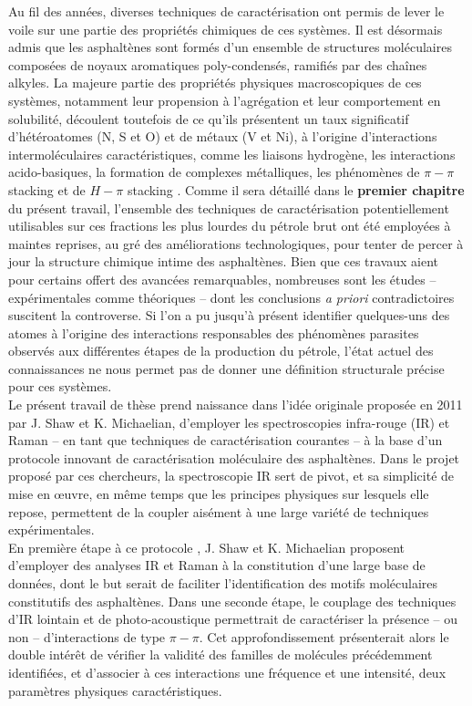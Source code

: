 	Au fil des années, diverses techniques de caractérisation ont permis de lever le voile sur une partie des propriétés chimiques de ces systèmes. Il est désormais admis que les asphaltènes sont formés d'un ensemble de structures moléculaires composées de noyaux aromatiques poly-condensés, ramifiés par des chaînes alkyles. La majeure partie des propriétés physiques macroscopiques de ces systèmes, notamment leur propension à l'agrégation et leur comportement en solubilité, découlent toutefois de ce qu'ils présentent un taux significatif d'hétéroatomes (N, S et O) et de métaux (V et Ni), à l'origine d'interactions intermoléculaires caractéristiques, comme les liaisons hydrogène, les interactions acido-basiques, la formation de complexes métalliques, les phénomènes de \og $\pi-\pi$ stacking \fg{} et de \og $H-\pi$ stacking \fg{}. Comme il sera détaillé dans le \textbf{premier chapitre} du présent travail, l'ensemble des techniques de caractérisation potentiellement utilisables sur ces fractions les plus lourdes du pétrole brut ont été employées à maintes reprises, au gré des améliorations technologiques, pour tenter de percer à jour la structure chimique intime des asphaltènes. Bien que ces travaux aient pour certains offert des avancées remarquables, nombreuses sont les études -- expérimentales comme théoriques -- dont les conclusions \textit{a priori} contradictoires suscitent la controverse. Si l'on a pu jusqu'à présent identifier quelques-uns des atomes à l'origine des interactions responsables des phénomènes parasites observés aux différentes étapes de la production du pétrole, l'état actuel des connaissances ne nous permet pas de donner une définition structurale précise pour ces systèmes. \\
	
	Le présent travail de thèse prend naissance dans l'idée originale proposée en 2011 par J. Shaw et K. Michaelian, d'employer les spectroscopies infra-rouge (IR) et Raman -- en tant que techniques de caractérisation courantes -- à la base d'un \og protocole \fg{} innovant de caractérisation moléculaire des asphaltènes. Dans le projet proposé par ces chercheurs, la spectroscopie IR sert de pivot, et sa simplicité de mise en œuvre, en même temps que les principes physiques sur lesquels elle repose, permettent de la coupler aisément à une large variété de techniques expérimentales.\\
	
	En première étape à ce \og protocole \fg, J. Shaw et K. Michaelian proposent d'employer des analyses IR et Raman à la constitution d'une large base de données, dont le but serait de faciliter l'identification des motifs moléculaires constitutifs des asphaltènes. 
	Dans une seconde étape, le couplage des techniques d'IR lointain et de photo-acoustique permettrait de caractériser la présence -- ou non -- d'interactions de type $\pi-\pi$. Cet approfondissement présenterait alors le double intérêt de vérifier la validité des familles de molécules précédemment identifiées, et d'associer à ces interactions une fréquence et une intensité, deux paramètres physiques caractéristiques. \\
	
